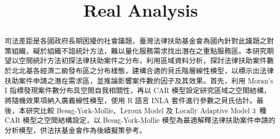 \documentclass[12pt,a4paper]{report}
\title{Real Analysis}
\author{}
\date{}
\begin{document}
\begin{CJK}{UTF8}{bsmi}%
\CJKindent

\maketitle

\begin{abstract}


司法差距是各國政府長期困擾的社會議題，臺灣法律扶助基金會為國內針對此議題之對策組織，礙於組織不諳統計方法，難以量化服務需求找出潛在之重點服務區。本研究期望以空間統計方法初探法律扶助案件之分布，利用區域資料分析，探討法律扶助案件數於北北基各經濟二級發布區之分布樣態，建構合適的貝氏階層線性模型，以標示出法律扶助案件申請之潛在需求區，並推論影響案件數的因子及其效果。首先，利用 Moran's I 指標發現案件數分布具空間自我相關性，再以 CAR 模型設定研究區域之空間結構，將隨機效果項納入廣義線性模型，使用 R 語言 INLA 套件進行參數之貝氏估計。最後，本研究比較 Besag-York-Mollie、Leroux Model 及 Locally Adaptive Model 3~種 CAR 模型之空間結構設定，以 Besag-York-Mollie 模型為最適解釋法律扶助案件申請的分析模型，供法扶基金會作為後續擬策參考。

\end{abstract}

\end{CJK}
\end{document}
